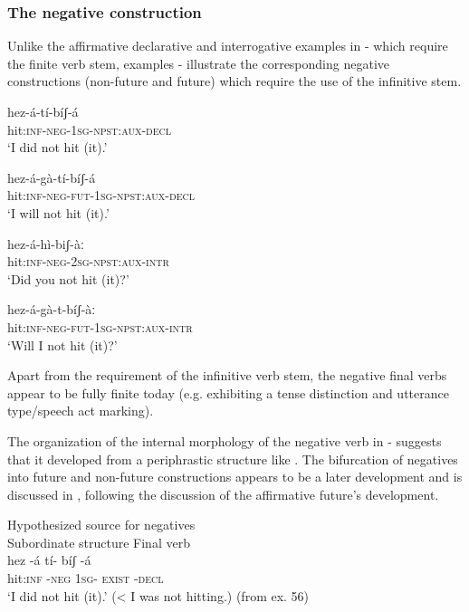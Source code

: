 \documentclass[output=paper]{langsci/langscibook}
\begin{document}
\subsubsection{The negative construction}\label{sec:mahland:3.1.1}

Unlike the affirmative declarative and interrogative examples in - which require the finite verb stem, examples - illustrate the corresponding negative constructions (non-future and future) which require the use of the infinitive stem.

\ea\label{ex:mahland:56}
\gll hez-á-tí-bíʃ-á\\
hit:\textsc{inf-neg-1sg-npst:aux-decl} \\
\glt `I did not hit (it).'
\z

\ea\label{ex:mahland:57}
\gll hez-á-gà-tí-bíʃ-á\\
hit:\textsc{inf-neg-fut-1sg-npst:aux-decl} \\
\glt `I will not hit (it).'
\z

\ea\label{ex:mahland:58}
\gll hez-á-hì-biʃ-àː\\
hit:\textsc{inf-neg-2sg-npst:aux-intr}\\
\glt `Did you not hit (it)?'
\z

\ea\label{ex:mahland:59}
\gll hez-á-gà-t-bíʃ-àː\\
hit:\textsc{inf-neg-fut-1sg-npst:aux-intr}\\
\glt `Will I not hit (it)?'
\z

Apart from the requirement of the infinitive verb stem, the negative final verbs appear to be fully finite today (e.g. exhibiting a tense distinction and utterance type/speech act marking). 

The organization of the internal morphology of the negative verb in - suggests that it developed from a periphrastic structure like . The bifurcation of negatives into future and non-future constructions appears to be a later development and is discussed in , following the discussion of the affirmative future's development.

\ea\label{ex:mahland:60}
Hypothesized source for negatives\\
Subordinate structure        Final verb\\
\gll  hez                {}-á                 tí-           bíʃ      {}-á    \\
  hit\textsc{:inf}          \textsc{{}-neg}            \textsc{1sg}{}-            \textsc{exist   {}-decl} \\
  \glt `I did not hit (it).' ({\textless} I was not hitting.)  (from ex. 56)
  \z
 
\end{document}
